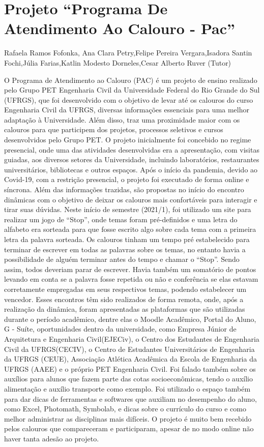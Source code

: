 \section*{Projeto “Programa De Atendimento Ao Calouro - Pac”}

Rafaela Ramos Fofonka, Ana Clara Petry,Felipe Pereira Vergara,Isadora Santin Fochi,Júlia Farias,Katlin Modesto Dorneles,Cesar Alberto Ruver (Tutor)

O Programa de Atendimento ao Calouro (PAC) é um projeto de ensino realizado pelo
Grupo PET Engenharia Civil da Universidade Federal do Rio Grande do Sul (UFRGS), que foi
desenvolvido com o objetivo de levar até os calouros do curso Engenharia Civil da UFRGS,
diversas informações essenciais para uma melhor adaptação à Universidade. Além disso, traz
uma proximidade maior com os calouros para que participem dos projetos, processos seletivos e
cursos desenvolvidos pelo Grupo PET. O projeto inicialmente foi concebido no regime
presencial, onde uma das atividades desenvolvidas era a apresentação, com visitas guiadas, aos
diversos setores da Universidade, incluindo laboratórios, restaurantes universitários, bibliotecas e
outros espaços. Após o início da pandemia, devido ao Covid-19, com a restrição presencial, o
projeto foi executado de forma online e síncrona. Além das informações trazidas, são propostas
no início do encontro dinâmicas com o objetivo de deixar os calouros mais confortáveis para
interagir e tirar suas dúvidas. Neste início de semestre (2021/1), foi utilizado um site para
realizar um jogo de “Stop”, onde temas foram pré-definidos e uma letra do alfabeto era sorteada
para que fosse escrito algo sobre cada tema com a primeira letra da palavra sorteada. Os calouros
tinham um tempo pré estabelecido para terminar de escrever em todas as palavras sobre os
temas, no entanto havia a possibilidade de alguém terminar antes do tempo e chamar o “Stop”.
Sendo assim, todos deveriam parar de escrever. Havia também um somatório de pontos levando
em conta se a palavra fosse repetida ou não e conferência se elas estavam corretamente
empregadas em seus respectivos temas, podendo estabelecer um vencedor. Esses encontros têm
sido realizados de forma remota, onde, após a realização da dinâmica, foram apresentadas as
plataformas que são utilizadas durante o período acadêmico, dentre elas o Moodle Acadêmico,
Portal do Aluno, G - Suíte, oportunidades dentro da universidade, como Empresa Júnior de
Arquitetura e Engenharia Civil(EJECiv), o Centro dos Estudantes de Engenharia Civil da
UFRGS(CECIV), o Centro de Estudantes Universitários de Engenharia da UFRGS (CEUE),
Associação Atlética Acadêmica da Escola de Engenharia da UFRGS (AAEE) e o próprio PET
Engenharia Civil. Foi falado também sobre os auxílios para alunos que fazem parte das cotas
socioeconômicas, tendo o auxílio alimentação e auxílio transporte como exemplo. Foi utilizado o
espaço também para dar dicas de ferramentas e softwares que auxiliam no desempenho do aluno,
como Excel, Photomath, Symbolab, e dicas sobre o currículo do curso e como melhor
administrar as disciplinas mais difíceis. O projeto é muito bem recebido pelos calouros que
compareceram e participaram, apesar de no modo online não haver tanta adesão ao projeto.

